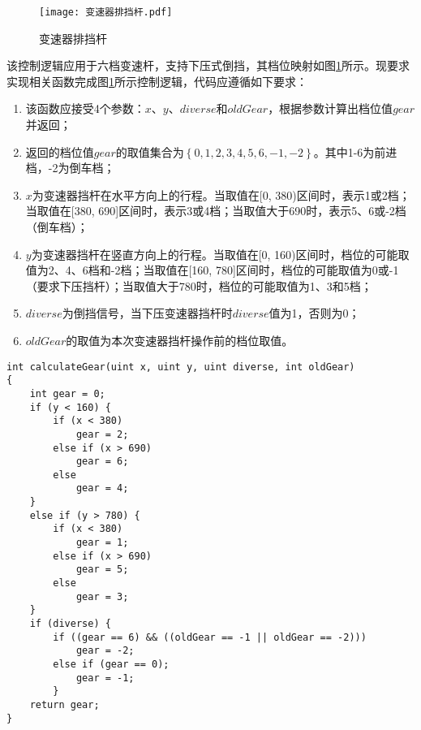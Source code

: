 \begin{figure}[H]
	\centering
	\texttt{[image: 变速器排挡杆.pdf]}
	\caption{变速器排挡杆}
	\label{fig:gearLever}
\end{figure}

该控制逻辑应用于六档变速杆，支持下压式倒挡，其档位映射如图\ref{fig:gearLever}所示。现要求实现相关函数完成图\ref{fig:gearLever}所示控制逻辑，代码应遵循如下要求：

\begin{enumerate}
	\item 该函数应接受4个参数：$ x $、$ y $、$ diverse $和$ oldGear $，根据参数计算出档位值$ gear $并返回；
	\item 返回的档位值$ gear $的取值集合为$\left\{0, 1, 2, 3, 4, 5, 6, -1, -2\right\}$。其中1-6为前进档，-2为倒车档；
	\item $ x $为变速器挡杆在水平方向上的行程。当取值在[0, 380)区间时，表示1或2档；当取值在[380, 690]区间时，表示3或4档；当取值大于690时，表示5、6或-2档（倒车档）；
	\item  $ y $为变速器挡杆在竖直方向上的行程。当取值在[0, 160)区间时，档位的可能取值为2、4、6档和-2档；当取值在[160, 780]区间时，档位的可能取值为0或-1（要求下压挡杆）；当取值大于780时，档位的可能取值为1、3和5档；
	\item $ diverse $为倒挡信号，当下压变速器挡杆时$ diverse $值为1，否则为0；
	\item $ oldGear $的取值为本次变速器挡杆操作前的档位取值。
\end{enumerate}

\begin{lstlisting}[label=code:gearLever,caption=变速器档位控制的一个函数实现]
int calculateGear(uint x, uint y, uint diverse, int oldGear)
{
	int gear = 0;
	if (y < 160) {
		if (x < 380)
			gear = 2;
		else if (x > 690)
			gear = 6;
		else
			gear = 4;
	}
	else if (y > 780) {
		if (x < 380)
			gear = 1;
		else if (x > 690)
			gear = 5;
		else
			gear = 3;
	}
	if (diverse) {
		if ((gear == 6) && ((oldGear == -1 || oldGear == -2)))
			gear = -2;
		else if (gear == 0);
			gear = -1;
		}
	return gear;
}
\end{lstlisting}

